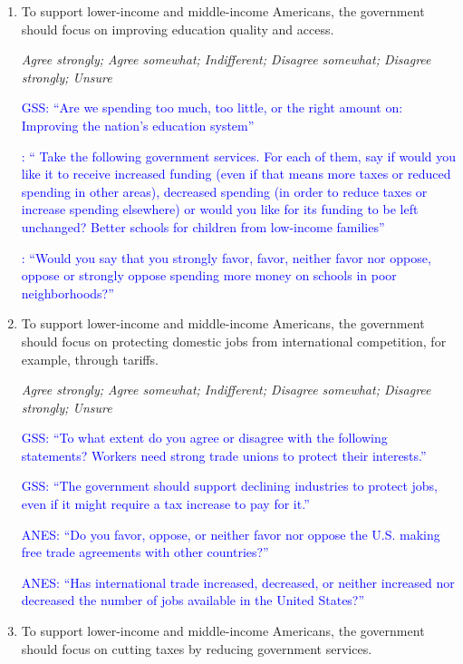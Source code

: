 \documentclass[11pt, headsepline]{article}
\newcommand{\blue}[1]{\textcolor{blue}{#1}}
\begin{document}
\begin{enumerate}[resume]
    \item To support lower-income and middle-income Americans, the government should focus on improving education quality and access.

    \textit{Agree strongly; Agree somewhat; Indifferent; Disagree somewhat; Disagree strongly; Unsure}

    \blue{GSS: ``Are we spending too much, too little, or the right amount on: Improving the nation's education system''}

    \blue{\cite{stantcheva2021understanding}: `` Take the following government services. For each of them, say if would you like it to receive increased funding (even if that means more taxes or reduced spending in other areas), decreased spending (in order to reduce taxes or increase spending elsewhere) or would you like for its funding to be left unchanged? Better schools for children from low-income families''}

    \blue{\cite{alesina2023immigration}: ``Would you say that you strongly favor, favor, neither favor nor oppose, oppose or strongly oppose spending more money on schools in poor neighborhoods?''}

    \item To support lower-income and middle-income Americans, the government should focus on protecting domestic jobs from international competition, for example, through tariffs.

    \textit{Agree strongly; Agree somewhat; Indifferent; Disagree somewhat; Disagree strongly; Unsure}

    \blue{GSS: ``To what extent do you agree or disagree with the following statements? Workers need strong trade unions to protect their interests.''}

    \blue{GSS: ``The government should support declining industries to protect jobs, even if it might require a tax increase to pay for it.''}

    \blue{ANES: ``Do you favor, oppose, or neither favor nor oppose the U.S. making free trade agreements with other countries?''}

    \blue{ANES: ``Has international trade increased, decreased, or neither increased nor decreased the number of jobs available in the United States?''}

    \item To support lower-income and middle-income Americans, the government should focus on cutting taxes by reducing government services.


\end{enumerate}
\end{document}
